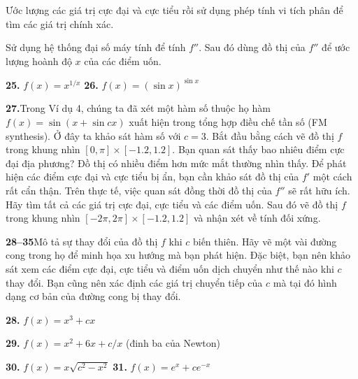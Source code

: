 \documentclass[10pt,a4paper]{article}
\newcommand{\casicon}{%
  \tikz[baseline=-0.6ex]{%
    \node[draw=stewartblue, rounded corners=0.5pt, line width=0.6pt, inner sep=0.8pt, text=stewartblue, font=\sffamily\bfseries\fontsize{6.5pt}{7pt}\selectfont, minimum size=8.5pt] {T};%
  }%
}
\newcommand{\exercisedivider}{\par\vspace{4pt}{\color{stewartblue!60}\hrule height 0.45pt}\vspace{4pt}}
\begin{document}
\begin{minipage}[t]{0.485\textwidth}
  \begin{exsubparts}[start=3]
    \item Ước lượng các giá trị cực đại và cực tiểu rồi sử dụng phép tính vi tích phân để tìm các giá trị chính xác.
    \item[\llap{\casicon\hspace{3pt}}\textbf{(d)}] Sử dụng hệ thống đại số máy tính để tính $f''$. Sau đó dùng đồ thị của $f''$ để ước lượng hoành độ $x$ của các điểm uốn.
  \end{exsubparts}
  \vspace{2pt}
  \noindent\textbf{25.}\;\; $f(x) = x^{1/x}$ \hfill \textbf{26.}\;\; $f(x) = (\sin x)^{\sin x}$

  \exercisedivider

  \noindent\textbf{27.}\quad Trong Ví dụ 4, chúng ta đã xét một hàm số thuộc họ hàm $f(x) = \sin(x + \sin cx)$ xuất hiện trong tổng hợp điều chế tần số (FM synthesis). Ở đây ta khảo sát hàm số với $c = 3$. Bắt đầu bằng cách vẽ đồ thị $f$ trong khung nhìn $[0, \pi] \times [-1.2, 1.2]$. Bạn quan sát thấy bao nhiêu điểm cực đại địa phương? Đồ thị có nhiều điểm hơn mức mắt thường nhìn thấy. Để phát hiện các điểm cực đại và cực tiểu bị ẩn, bạn cần khảo sát đồ thị của $f'$ một cách rất cẩn thận. Trên thực tế, việc quan sát đồng thời đồ thị của $f''$ sẽ rất hữu ích. Hãy tìm tất cả các giá trị cực đại, cực tiểu và các điểm uốn. Sau đó vẽ đồ thị $f$ trong khung nhìn $[-2\pi, 2\pi] \times [-1.2, 1.2]$ và nhận xét về tính đối xứng.
  \vspace{4pt}

  \noindent\textbf{\color{stewartblue}28--35}\quad Mô tả sự thay đổi của đồ thị $f$ khi $c$ biến thiên. Hãy vẽ một vài đường cong trong họ để minh họa xu hướng mà bạn phát hiện. Đặc biệt, bạn nên khảo sát xem các điểm cực đại, cực tiểu và điểm uốn dịch chuyển như thế nào khi $c$ thay đổi. Bạn cũng nên xác định các giá trị chuyển tiếp của $c$ mà tại đó hình dạng cơ bản của đường cong bị thay đổi.
  \vspace{3pt}

  \noindent\textbf{28.}\;\; $f(x) = x^3 + cx$
  \vspace{2.5pt}

  \noindent\textbf{29.}\;\; $f(x) = x^2 + 6x + c/x$ \quad (đinh ba của Newton)
  \vspace{2.5pt}

  \noindent\textbf{30.}\;\; $f(x) = x\sqrt{c^2 - x^2}$ \hfill \textbf{31.}\;\; $f(x) = e^x + c e^{-x}$
  \vspace{2.5pt}


\end{minipage}
\end{document}
